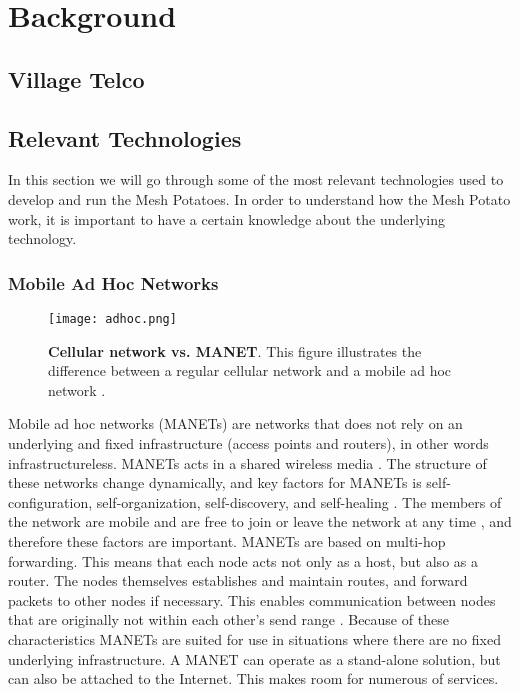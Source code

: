 \chapter{Background}
\label{chp:background} 

\section{Village Telco}

\section{Relevant Technologies}
In this section we will go through some of the most relevant technologies used to develop and run the Mesh Potatoes. In order to understand how the Mesh Potato work, it is important to have a certain knowledge about the underlying technology. 

\subsection{Mobile Ad Hoc Networks}

\begin{figure}[b]
  \centering
    \texttt{[image: adhoc.png]}
     \caption [Cellular network vs. MANET]{\textbf{Cellular network vs. MANET}. This figure illustrates the difference between a regular cellular network and a mobile ad hoc network \cite{adhoc2}.}
\label{fig:adhoc}
\end{figure}

Mobile ad hoc networks (MANETs) are networks that does not rely on an underlying and fixed infrastructure (access points and routers), in other words infrastructureless. MANETs acts in a shared wireless media \cite{adhoc}. The structure of these networks change dynamically, and key factors for MANETs is self-configuration, self-organization, self-discovery, and self-healing \cite{wmn}. The members of the network are mobile and are free to join or leave the network at any time \cite{adhoc2}, and therefore these factors are important. MANETs are based on multi-hop forwarding. This means that each node acts not only as a host, but also as a router. The nodes themselves establishes and maintain routes, and forward packets to other nodes if necessary. This enables communication between nodes that are originally not within each other's send range \cite{adhoc2}. Because of these characteristics MANETs are suited for use in situations where there are no fixed underlying infrastructure. A MANET can operate as a stand-alone solution, but can also be attached to the Internet. This makes room for numerous of services. 

